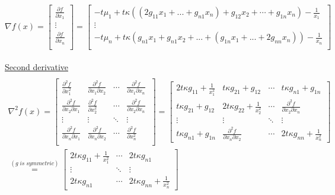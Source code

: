 \documentclass[fleqn]{article}
\begin{document}
$
\nabla f(x) = \begin{bmatrix} \frac{\partial f}{\partial x_1} \\
				\vdots \\     \frac{\partial f}{\partial x_n} \\ \end{bmatrix} 
=
\begin{bmatrix} 
	-t \mu_1 + t\kappa ((2 g_{11} x_1 +...+g_{n1}x_n)+
		 g_{12}x_2 + \cdots + g_{1n}x_n) - \frac{1}{x_1}\\
	\vdots 							\\
	-t \mu_n+ t\kappa(g_{n1}x_1 +g_{n1}x_2 + ...+ (g_{1n}x_1+...+2g_{nn}x_n))  - \frac{1}{x_n}\\
\end{bmatrix} 
$ \\ \\












\underline{Second derivative}\\
\begin{multline*} \\
\nabla^2 f(x) = \begin{bmatrix} 
\frac{\partial^2 f}{\partial x_1^2} & \frac{\partial^2 f}{\partial x_1 \partial x_2} & \cdots & \frac{\partial^2 f}{\partial x_1 \partial x_n}\
\\ 
\frac{\partial^2 f}{\partial x_2 \partial x_1} & \frac{\partial^2 f}{\partial x_2^2} & \cdots & \frac{\partial^2 f}{\partial x_2 \partial x_n}
\\ 
\vdots & \vdots & \ddots & \vdots
\\ 
\frac{\partial^2 f}{\partial x_n \partial x_1} & \frac{\partial^2 f}{\partial x_n \partial x_2} & \cdots & \frac{\partial^2 f}{\partial x_n^2}
\\ 
				\end{bmatrix}
=
\begin{bmatrix} 
	2t \kappa g_{11} + \frac{1}{x_1^2} &
	t \kappa g_{21} + g_{12}           & \cdots &
	t \kappa g_{n1} + g_{1n}
		\\ 
	t \kappa g_{21} + g_{12}           &
	2t \kappa g_{22} + \frac{1}{x_2^2} & \cdots &
	\frac{\partial^2 f}{\partial x_2 \partial 	x_n}
		\\ 
	\vdots & \vdots & \ddots & \vdots
	\\ 
	t \kappa g_{n1} + g_{1n} & \frac{\partial^2 f}		{\partial x_n \partial x_2} & \cdots & 2t \kappa g_{nn} + \frac{1}{x_n^2}
\end{bmatrix} \\
\stackrel{(g \; is \; symmetric)}{=}
\begin{bmatrix} 
	2t \kappa g_{11} + \frac{1}{x_1^2} & \cdots &
	2t \kappa g_{n1}
		\\ 
	\vdots &  \ddots & \vdots
		\\ 
	2t \kappa g_{n1} &  \cdots & 2t \kappa g_{nn} + \frac{1}{x_n^2}
\end{bmatrix}
\end{multline*} \\ \\
\end{document}
